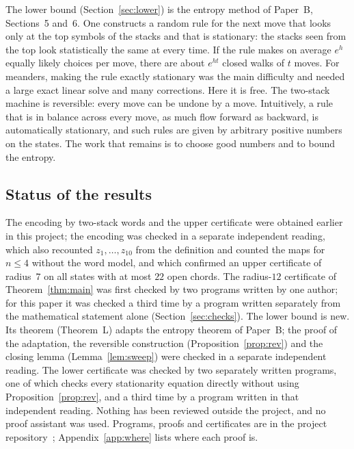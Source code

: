 The lower bound (Section~\ref{sec:lower}) is the entropy method of Paper~B, Sections~5 and~6. One constructs a random rule
for the next move that looks only at the top symbols of the stacks and that is stationary: the stacks seen from the
top look statistically the same at every time. If the rule makes on average $e^h$ equally likely choices per move,
there are about $e^{ht}$ closed walks of $t$ moves. For meanders, making the rule exactly stationary was the main
difficulty and needed a large exact linear solve and many corrections. Here it is free. The two-stack machine is
reversible: every move can be undone by a move. Intuitively, a rule that is in balance across every move, as much flow
forward as backward, is automatically stationary, and such rules are given by arbitrary positive numbers on the
states. The work that remains is to choose good numbers and to bound the entropy.

\subsection{Status of the results}

The encoding by two-stack words and the upper certificate were obtained earlier in this project; the encoding was
checked in a separate independent reading, which also recounted $z_1,\ldots,z_{10}$ from the definition and counted
the maps for $n\le4$ without the word model, and which confirmed an upper certificate of radius~$7$ on all states with
at most $22$ open chords. The radius-$12$ certificate of Theorem~\ref{thm:main} was first checked by two programs written
by one author; for this paper it was checked a third time by a program written separately from the mathematical
statement alone (Section~\ref{sec:checks}). The lower bound is new. Its theorem (Theorem~L) adapts the entropy
theorem of Paper~B; the proof of the adaptation, the reversible construction (Proposition~\ref{prop:rev}) and the
closing lemma (Lemma~\ref{lem:sweep}) were checked in a separate independent reading. The lower certificate was
checked by two separately written programs, one of which checks every stationarity equation directly without using
Proposition~\ref{prop:rev}, and a third time by a program written in that independent reading. Nothing has been reviewed outside the project, and no proof
assistant was used. Programs, proofs and certificates are in the project repository~\cite{Repo};
Appendix~\ref{app:where} lists where each proof is.
